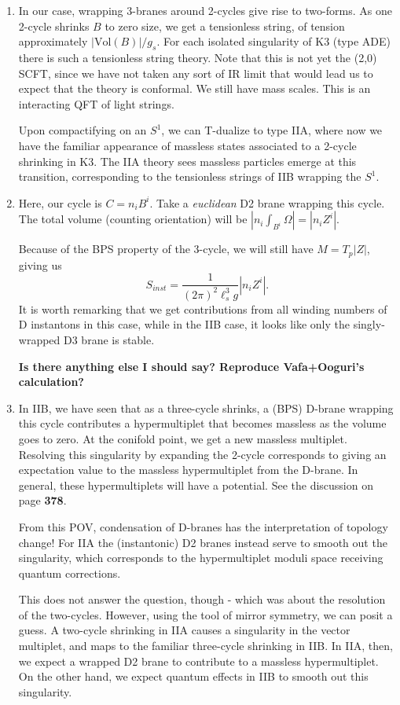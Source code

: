 \documentclass[11pt, class=article, crop=false]{standalone}
\begin{document}
\begin{enumerate}
	\item In our case, wrapping 3-branes around 2-cycles give rise to two-forms. As one 2-cycle shrinks $B$ to zero size, we get a tensionless string, of tension approximately $|\text{Vol}(B)|/g_s$. For each isolated singularity of K3 (type ADE) there is such a tensionless string theory. Note that this is not yet the (2,0) SCFT, since we have not taken any sort of IR limit that would lead us to expect that the theory is conformal. We still have mass scales. This is an interacting QFT of light strings. 
	
	Upon compactifying on an $S^1$, we can T-dualize to type IIA, where now we have the familiar appearance of massless states associated to a 2-cycle shrinking in K3. The IIA theory sees massless particles emerge at this transition, corresponding to the tensionless strings of IIB wrapping the $S^1$.
	
	\item Here, our cycle is $C = n_i B^i$. Take a \emph{euclidean} D2 brane wrapping this cycle. The total volume (counting orientation) will be $|n_i \int_{B^i} \Omega| = |n_i Z^i|$. 
	
	Because of the BPS property of the 3-cycle, we will still have $M = T_p |Z|$, giving us
	\[
		S_{inst} = \frac{1}{(2\pi)^2 \ell_s^3 g} |n_i Z^i|.
	\]
	It is worth remarking that we get contributions from all winding numbers of D instantons in this case, while in the IIB case, it looks like only the singly-wrapped D3 brane is stable.
	
	\textbf{Is there anything else I should say? Reproduce Vafa+Ooguri's calculation?}
	
	\item In IIB, we have seen that as a three-cycle shrinks, a (BPS) D-brane wrapping this cycle contributes a hypermultiplet that becomes massless as the volume goes to zero. At the conifold point, we get a new massless multiplet. Resolving this singularity by expanding the 2-cycle corresponds to giving an expectation value to the massless hypermultiplet from the D-brane. In general, these hypermultiplets will have a potential. See the discussion on page \textbf{378}.
	
	From this POV, condensation of D-branes has the interpretation of topology change! For IIA the (instantonic) D2 branes instead serve to smooth out the singularity, which corresponds to the hypermultiplet moduli space receiving quantum corrections. 
	
	This does not answer the question, though - which was about the resolution of the two-cycles. However, using the tool of mirror symmetry, we can posit a guess. A two-cycle shrinking in IIA causes a singularity in the vector multiplet, and maps to the familiar three-cycle shrinking in IIB. In IIA, then, we expect a wrapped D2 brane to contribute to a massless hypermultiplet. On the other hand, we expect quantum effects in IIB to smooth out this singularity. 
	

\end{enumerate}
\end{document}
